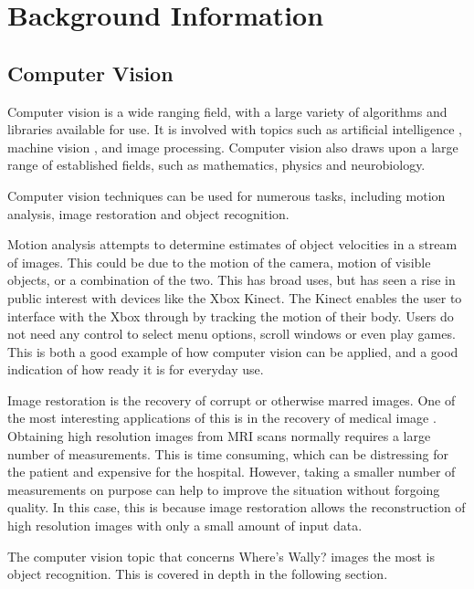 \documentclass[../main.tex]{subfiles}
\begin{document}
\section{Background Information}
  \subsection{Computer Vision}
    Computer vision is a wide ranging field, with a large variety of algorithms and libraries available for use.
    It is involved with topics such as artificial intelligence \cite{aivis}, machine vision \cite{robovision}, and image processing.
    Computer vision also draws upon a large range of established fields, such as mathematics, physics and neurobiology.
    
    Computer vision techniques can be used for numerous tasks, including motion analysis, image restoration and object recognition.

    Motion analysis attempts to determine estimates of object velocities in a stream of images.
    This could be due to the motion of the camera, motion of visible objects, or a combination of the two.
    This has broad uses, but has seen a rise in public interest with devices like the Xbox Kinect\cite{kinect}.
    The Kinect enables the user to interface with the Xbox through by tracking the motion of their body.
    Users do not need any control to select menu options, scroll windows or even play games.
    This is both a good example of how computer vision can be applied, and a good indication of how ready it is for everyday use.

    Image restoration is the recovery of corrupt or otherwise marred images.
    One of the most interesting applications of this is in the recovery of medical image \cite{imagerecovery}.
    Obtaining high resolution images from MRI scans normally requires a large number of measurements.
    This is time consuming, which can be distressing for the patient and expensive for the hospital.
    However, taking a smaller number of measurements on purpose can help to improve the situation without forgoing quality.
    In this case, this is because image restoration allows the reconstruction of high resolution images with only a small amount of input data.
    
    The computer vision topic that concerns Where's Wally? images the most is object recognition.
    This is covered in depth in the following section.
    
\end{document}
